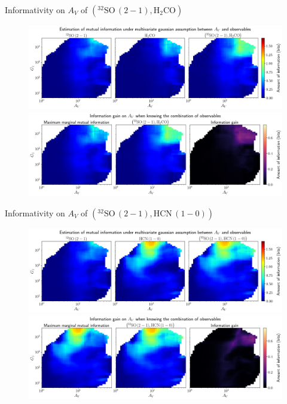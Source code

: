 \documentclass{beamer}
\begin{document}
\begin{frame}{Informativity on $A_V$ of $\left(\mathrm{^{32}SO\,(2-1)},\mathrm{H_2CO}\right)$}
    \begin{figure}
        \centering
        \includegraphics[width=0.95\linewidth]{../linearinfo/av__32so21_h2co_linearinfo.png}
        \vfill
        \includegraphics[width=0.95\linewidth]{../linearinfo/av__32so21_h2co_linearinfo_gain.png}
    \end{figure}
\end{frame}

\begin{frame}{Informativity on $A_V$ of $\left(\mathrm{^{32}SO\,(2-1)},\mathrm{HCN\,(1-0)}\right)$}
    \begin{figure}
        \centering
        \includegraphics[width=0.95\linewidth]{../linearinfo/av__32so21_hcn10_linearinfo.png}
        \vfill
        \includegraphics[width=0.95\linewidth]{../linearinfo/av__32so21_hcn10_linearinfo_gain.png}
    \end{figure}
\end{frame}
\end{document}
